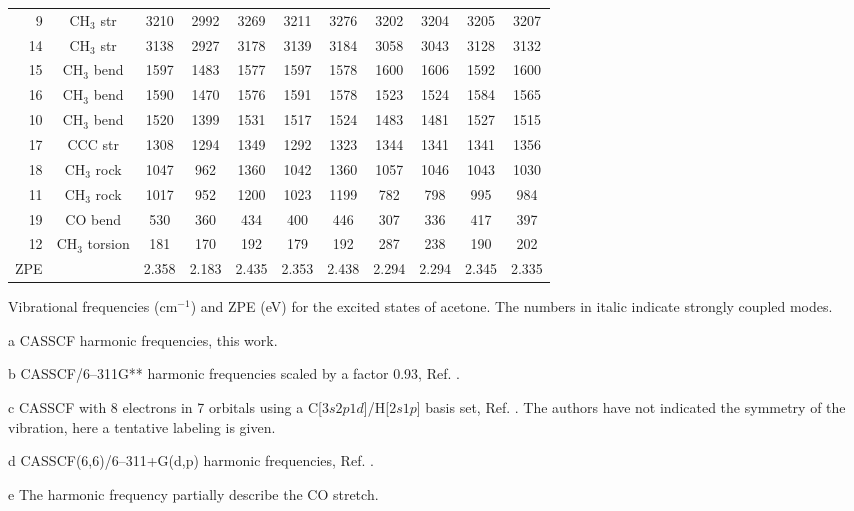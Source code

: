 \begin{center}
\begin{threeparttable}
\begin{tabular}{rcccccccccc}
 9 &CH$_3$  str   & 3210 & 2992 & 3269 & 3211 & 3276 & 3202 & 3204 & 3205 & 3207 \\
14 &CH$_3$  str   & 3138 & 2927 & 3178 & 3139 & 3184 & 3058 & 3043 & 3128 & 3132 \\
15 &CH$_3$  bend  & 1597 & 1483 & 1577 & 1597 & 1578 & 1600 & 1606 & 1592 & 1600 \\
16 &CH$_3$  bend  & 1590 & 1470 & 1576 & 1591 & 1578 & 1523 & 1524 & 1584 & 1565 \\
10 &CH$_3$  bend  & 1520 & 1399 & 1531 & 1517 & 1524 & 1483 & 1481 & 1527 & 1515 \\
17 &CCC str       & 1308 & 1294 & 1349 & 1292 & 1323 & 1344 & 1341 & 1341 & 1356 \\
18 &CH$_3$ rock   & 1047 &  962 & 1360 & 1042 & 1360 & 1057 & 1046 & 1043 & 1030 \\
11 &CH$_3$ rock   & 1017 &  952 & 1200 & 1023 & 1199 &  782 &  798 &  995 &  984 \\
19 &CO bend       &  530 &  360 &  434 &  400 &  446 &  307 &  336 &  417 &  397 \\
12 &CH$_3$ torsion&  181 &  170 &  192 &  179 &  192 &  287 &  238 &  190 &  202 \\
\hline                                                          
   ZPE   &        & 2.358& 2.183& 2.435& 2.353& 2.438& 2.294& 2.294& 2.345& 2.335\\
\end{tabular}
\caption{\footnotesize Vibrational frequencies (cm$^{-1}$) and ZPE (eV)
for the excited states of acetone. The numbers in italic indicate strongly coupled modes.
}\label{tbl:vibra_exc_aceto}
\begin{tablenotes}
\footnotesize
\item[a]CASSCF harmonic frequencies, this work.
\item[b]CASSCF/6--311G** harmonic frequencies scaled by a factor 0.93, Ref. 
.
\item[c]CASSCF with 8 electrons in 7 orbitals using a C[$3s2p1d$]/H[$2s1p$] basis set,
Ref. . The authors have not indicated the symmetry of the vibration, here a
tentative labeling is given.
\item[d]CASSCF(6,6)/6--311+G(d,p) harmonic frequencies, Ref. .
\item[e]The harmonic frequency partially describe the CO  stretch.
\end{tablenotes}
\end{threeparttable}
\end{center}
